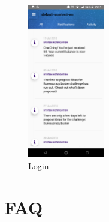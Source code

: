 \begin{figure}[!h]
	\begin{center}
		\includegraphics[width=0.3\textwidth]{./img/anexo1/notificaciones_all.png}
		\caption{Login}
		\label{fig:notificaciones}
	\end{center}
\end{figure}

\section{FAQ}
